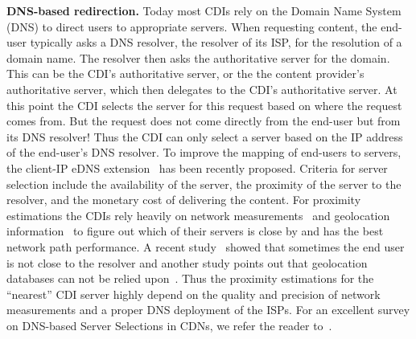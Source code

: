 \vspace{1em} \noindent \textbf{DNS-based redirection.} Today most CDIs rely on
the Domain Name System (DNS) to direct users to appropriate servers.  When
requesting content, the end-user typically asks a DNS resolver, \eg the
resolver of its ISP, for the resolution of a domain name. The resolver then
asks the authoritative server for the domain.  This can be the CDI's
authoritative server, or the the content provider's authoritative server, which
then delegates to the CDI's authoritative server.  At this point the CDI
selects the server for this request based on where the request comes from. But
the request does not come directly from the end-user but from its DNS resolver!
Thus the CDI can only select a server based on the IP address of the end-user's
DNS resolver. To improve the mapping of end-users to servers, the client-IP
eDNS extension~\cite{DNS-extension-IP-client} has been recently proposed.
Criteria for server selection include the availability of the server, the
proximity of the server to the resolver, and the monetary cost of delivering
the content. For proximity estimations the CDIs rely heavily on network
measurements~\cite{Akamai-Network} and geolocation information~\cite{MaxMind}
to figure out which of their servers is close by and has the best network path
performance.  A recent study~\cite{DNS-IMC-2010} showed that sometimes the end
user is not close to the resolver and another study points out that geolocation
databases can not be relied upon~\cite{PUKDG-IGDU-11}. Thus the proximity
estimations for the ``nearest'' CDI server highly depend on the quality and
precision of network measurements and a proper DNS deployment of the ISPs. For
an excellent survey on DNS-based Server Selections in CDNs, we refer the reader
to~\cite{dns-redirection}.

